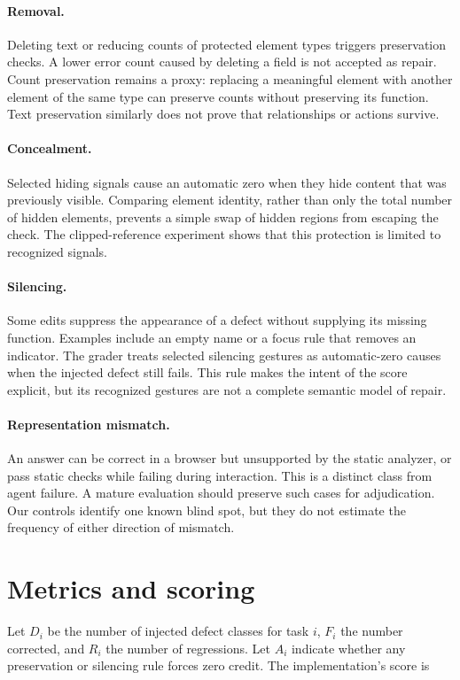 \documentclass{article}
\begin{document}
\paragraph{Removal.} Deleting text or reducing counts of protected element types triggers preservation checks. A lower error count caused by deleting a field is not accepted as repair. Count preservation remains a proxy: replacing a meaningful element with another element of the same type can preserve counts without preserving its function. Text preservation similarly does not prove that relationships or actions survive.
\paragraph{Concealment.} Selected hiding signals cause an automatic zero when they hide content that was previously visible. Comparing element identity, rather than only the total number of hidden elements, prevents a simple swap of hidden regions from escaping the check. The clipped-reference experiment shows that this protection is limited to recognized signals.
\paragraph{Silencing.} Some edits suppress the appearance of a defect without supplying its missing function. Examples include an empty name or a focus rule that removes an indicator. The grader treats selected silencing gestures as automatic-zero causes when the injected defect still fails. This rule makes the intent of the score explicit, but its recognized gestures are not a complete semantic model of repair.
\paragraph{Representation mismatch.} An answer can be correct in a browser but unsupported by the static analyzer, or pass static checks while failing during interaction. This is a distinct class from agent failure. A mature evaluation should preserve such cases for adjudication. Our controls identify one known blind spot, but they do not estimate the frequency of either direction of mismatch.

\section{Metrics and scoring}
Let $D_i$ be the number of injected defect classes for task $i$, $F_i$ the number corrected, and $R_i$ the number of regressions. Let $A_i$ indicate whether any preservation or silencing rule forces zero credit. The implementation's score is
\end{document}
